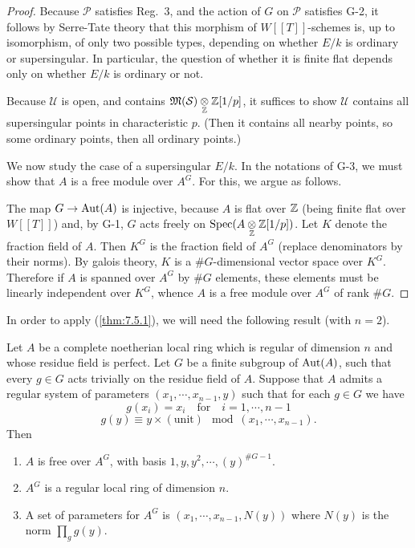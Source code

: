\begin{proof}
Because $\mathcal{P}$ satisfies Reg.~3, and the action of $G$ on $\mathcal{P}$ satisfies G-2, it follows by Serre-Tate theory that this morphism of $W[[T]]$-schemes is, up to isomorphism, of only two possible types, depending on whether $E/k$ is ordinary or supersingular. In particular, the question of whether it is finite flat depends only on whether $E/k$ is ordinary or not.

Because $\mathcal{U}$ is open, and contains $\mathfrak{M}(\mathcal{S}) \underset{\mathbb{Z}}{\otimes} \mathbb{Z}[1/p]$, it suffices to show $\mathcal{U}$ contains all supersingular points in characteristic $p$. (Then it contains all nearby points, so some ordinary points, then all ordinary points.)

We now study the case of a supersingular $E/k$. In the notations of G-3, we must show that $A$ is a free module over $A^G$. For this, we argue as follows.

The map $G \to \operatorname{Aut}(A)$ is injective, because $A$ is flat over $\mathbb{Z}$ (being finite flat over $W[[T]]$) and, by G-1, $G$ acts freely on $\operatorname{Spec}(A \underset{\mathbb{Z}}{\otimes} \mathbb{Z}[1/p])$. Let $K$ denote the fraction field of $A$. Then $K^G$ is the fraction field of $A^G$ (replace denominators by their norms). By galois theory, $K$ is a $\#G$-dimensional vector space over $K^G$. Therefore if $A$ is spanned over $A^G$ by $\#G$ elements, these elements must be linearly independent over $K^G$, whence $A$ is a free module over $A^G$ of rank $\#G$.
\end{proof}

In order to apply (\ref{thm:7.5.1}), we will need the following result (with $n=2$).

\begin{kprop}\label{prop:7.5.2}
Let $A$ be a complete noetherian local ring which is regular of dimension $n$ and whose residue field is perfect. Let $G$ be a finite subgroup of $\operatorname{Aut}(A)$, such that every $g \in G$ acts trivially on the residue field of $A$. Suppose that $A$ admits a regular system of parameters $(x_1,\cdots,x_{n-1},y)$ such that for each $g \in G$ we have
\[
g(x_i) = x_i \quad \text{for} \quad i = 1,\cdots,n-1
\]
\[
g(y) \equiv y \times (\text{unit}) \mod (x_1,\cdots,x_{n-1}) .
\]
Then
\begin{enumerate}[(1)]
\item $A$ is free over $A^G$, with basis $1, y, y^2, \cdots, (y)^{\#G-1}$.
\item $A^G$ is a regular local ring of dimension $n$.
\item A set of parameters for $A^G$ is $(x_1,\cdots,x_{n-1},N(y))$ where $N(y)$ is the norm $\prod\limits_{g} g(y)$.
\end{enumerate}
\end{kprop}

